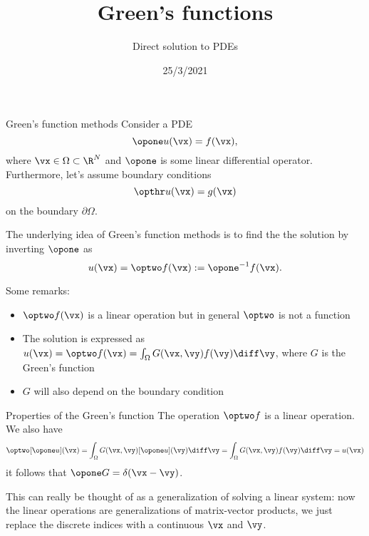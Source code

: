 

\title{Green's functions}
\subtitle{Direct solution to PDEs}
\date{25/3/2021}
\date{}


	
	\maketitle
	

\begin{frame}{Green's function methods}
	Consider a PDE
	\[ \opone u(\vx) = f(\vx), \]
	where $ \vx \in \Omega \subset \R^N $ and $ \opone $ is some linear differential operator. Furthermore, let's assume boundary conditions
	\[ \opthr u(\vx) = g(\vx) \]
	on the boundary $ \partial \Omega $.
	
	\pause
	The underlying idea of Green's function methods is to find the the solution by inverting $ \opone $ as
	\[ u(\vx) = \optwo f(\vx) := \opone^{-1} f(\vx). \]
	
	\pause
	Some remarks:
	\begin{itemize}[<+->]
		\item $ \optwo f(\vx) $ is a linear operation but in general $ \optwo $ is not a function
		\item The solution is expressed as $ u(\vx) = \optwo f(\vx) = \int_{\Omega} G(\vx,\vy) f(\vy) \diff \vy $, where $ G $ is the \alert{Green's function}
		\item $ G $ will also depend on the boundary condition
	\end{itemize}
\end{frame}

\begin{frame}{Properties of the Green's function}
	The operation $ \optwo f $ is a linear operation. We also have
	\[ \optwo [\opone u](\vx) = \int_{\Omega} G(\vx,\vy) [\opone u](\vy) \diff \vy = 
	\int_{\Omega} G(\vx,\vy) f(\vy) \diff \vy
	= u(\vx) \]
	it follows that $ \opone G = \delta(\vx - \vy) $. 
	
	\pause
	This can really be thought of as a generalization of solving a linear system: now the linear operations are generalizations of matrix-vector products, we just replace the discrete indices with a continuous $ \vx $ and $ \vy $. 
\end{frame}

